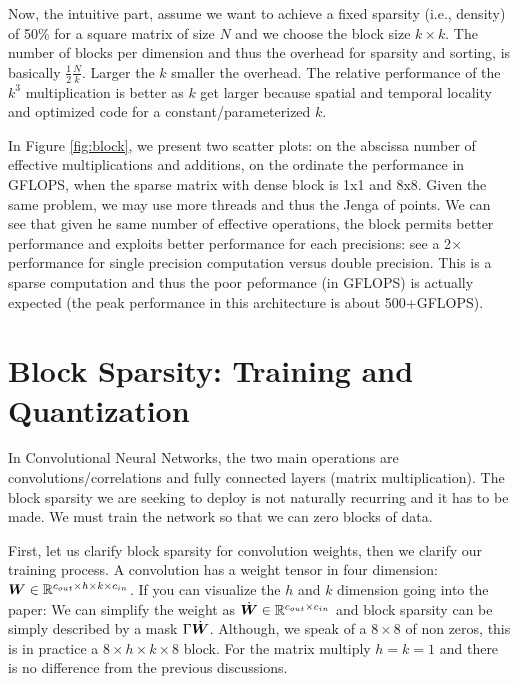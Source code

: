 \documentclass[conference]{IEEEtran}
\begin{document}
Now, the intuitive part, assume we want to achieve a fixed sparsity
(i.e., density) of 50\% for a square matrix of size $N$ and we choose
the block size $k \times k$. The number of blocks per dimension and
thus the overhead for sparsity and sorting, is basically
$\frac{1}{2}\frac{N}{k}$. Larger the $k$ smaller the overhead.  The
relative performance of the $k^3$ multiplication is better as $k$ get
larger because spatial and temporal locality and optimized code for a
constant/parameterized $k$.

 In Figure \ref{fig:block}, we present two
scatter plots: on the abscissa number of effective multiplications and
additions, on the ordinate the performance in GFLOPS, when the sparse
matrix with dense block is 1x1 and 8x8. Given the same problem, we
may use more threads and thus the Jenga of points.  We can see that
given he same number of effective operations, the block permits better
performance and exploits better performance for each precisions: see a
2{$\times$} performance for single precision computation versus double
precision. This is a sparse computation and thus the poor peformance
(in GFLOPS) is actually expected (the peak performance in this
architecture is about 500+GFLOPS).




\section{Block Sparsity: Training and Quantization}
\label{sec:training}

In Convolutional Neural Networks, the two main operations are
convolutions/correlations and fully connected layers (matrix
multiplication). The block sparsity we are seeking to deploy is not
naturally recurring and it has to be made. We must train the network
so that we can zero blocks of data.

First, let us clarify block sparsity for convolution weights, then we
clarify our training process. A convolution has a weight tensor in
four dimension: ${\boldsymbol W} \in \mathbb{R}^{c_{out}\times h \times k \times
  c_{in}}$. If you can visualize the $h$ and $k$ dimension going into
the paper: We can simplify the weight as $\dot{{\boldsymbol W}} \in \mathbb{R}^{c_{out}
  \times c_{in}}$ and block sparsity can be simply described by a mask
$\Gamma\dot{{\boldsymbol W}}$. Although, we speak of a $8\times 8$ of non
zeros, this is in practice a $8\times h\times k\times 8$ block. For
the matrix multiply $h=k=1$ and there is no difference from the
previous discussions.
\end{document}
